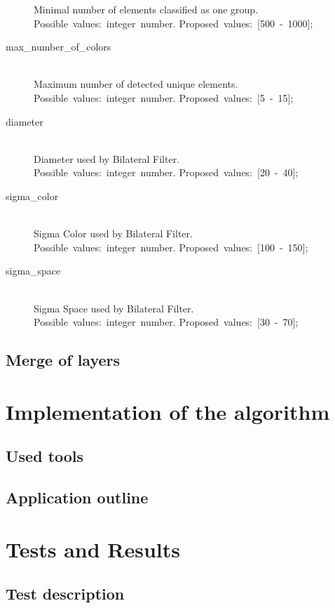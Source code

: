 \documentclass[a4paper,onecolumn,oneside,12pt]{memoir}
\begin{document}
\begin{description}
    Minimal number of elements classified as one group. \\
    Possible~values:~integer~number. Proposed~values:~[500~-~1000];
  \item[max\_number\_of\_colors] \hfill \\
    Maximum number of detected unique elements. \\
    Possible~values:~integer~number. Proposed~values:~[5~-~15];
  \item[diameter] \hfill \\
    Diameter used by Bilateral Filter. \\
    Possible~values:~integer~number. Proposed~values:~[20~-~40];
  \item[sigma\_color] \hfill \\
    Sigma Color used by Bilateral Filter. \\
    Possible~values:~integer~number. Proposed~values:~[100~-~150];
  \item[sigma\_space] \hfill \\
    Sigma Space used by Bilateral Filter. \\
    Possible~values:~integer~number. Proposed~values:~[30~-~70];
\end{description}

\section{Merge of layers}

\chapter{Implementation of the algorithm}

\section{Used tools}

\section{Application outline}

\chapter{Tests and Results}

\section{Test description}
\end{document}
